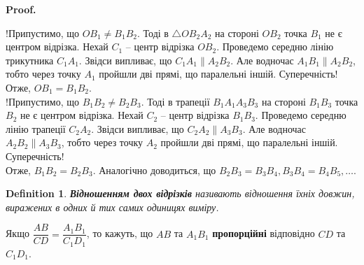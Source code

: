 \documentclass[a4paper, 10pt]{article}
\makeatletter
\theoremstyle{theoremdd}
\theoremstyle{theoremdd}
\theoremstyle{theoremdd}
\newtheorem{definition}[theorem]{Definition}
\theoremstyle{theoremdd}
\theoremstyle{theoremdd}
\theoremstyle{theoremdd}
\theoremstyle{theoremdd}
\theoremstyle{theoremdd}
\theoremstyle{theoremdd}
\renewenvironment{proof}[1][Proof.\\]{\par
\pushQED{\hfill \qed}%
\normalfont \topsep6\p@\@plus6\p@\relax
\trivlist
\item\relax
{\bfseries
#1\@addpunct{.}}\hspace\labelsep\ignorespaces
}{%
\popQED\endtrivlist\@endpefalse
}
\makeatother
\begin{document}
\begin{proof}
\begin{figure}[H]
\end{figure}
!Припустимо, що $OB_1 \neq B_1B_2$. Тоді в $\triangle OB_2A_2$ на стороні $OB_2$ точка $B_1$ не є центром відрізка. Нехай $C_1$ -- центр відрізка $OB_2$. Проведемо середню лінію трикутника $C_1A_1$. Звідси випливає, що $C_1A_1 \parallel A_2B_2$. Але водночас $A_1B_1 \parallel A_2B_2$, тобто через точку $A_1$ пройшли дві прямі, що паралельні іншій. Суперечність!
Отже, $OB_1 = B_1B_2$.
\bigskip \\
!Припустимо, що $B_1B_2 \neq B_2B_3$. Тоді в трапеції $B_1A_1A_3B_3$ на стороні $B_1B_3$ точка $B_2$ не є центром відрізка. Нехай $C_2$ -- центр відрізка $B_1B_3$. Проведемо середню лінію трапеції $C_2A_2$. Звідси випливає, що $C_2A_2 \parallel A_3B_3$. Але водночас $A_2B_2 \parallel A_3B_3$, тобто через точку $A_2$ пройшли дві прямі, що паралельні іншій. Суперечність!\\
Отже, $B_1B_2 = B_2B_3$. Аналогічно доводиться, що $B_2B_3 = B_3B_4, B_3B_4 = B_4B_5,\dots$.
\end{proof}

\begin{definition}
\textbf{Відношенням двох відрізків} називають відношення їхніх довжин, виражених в одних й тих самих одиницях виміру.
\end{definition}
Якщо $\dfrac{AB}{CD} = \dfrac{A_1B_1}{C_1D_1}$, то кажуть, що $AB$ та $A_1B_1$ \textbf{пропорційні} відповідно $CD$ та $C_1D_1$.
\end{document}
